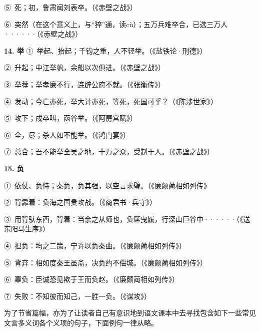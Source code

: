 ⑤\ 死；初，鲁肃闻刘表卒。（《赤壁之战》）

⑥\ 突然（在这个意义上，与“猝”通，读cù）；五万兵难卒合，已选三万人······（《赤壁之战》）

\textbf{14. 举}
①\ 举起、抬起；千钧之重，人不轻举。（《盐铁论·刑德》）

②\ 升起；中江举帆，余船以次俱进。（《赤壁之战》）

③\ 举荐；举孝廉不行，连辟公府不就。（《张衡传》）

④\ 发动；今亡亦死，举大计亦死，等死，死国可乎？（《陈涉世家》）

⑤\ 攻下；戍卒叫，函谷举。（《阿房宫赋》）

⑥\ 全，尽；杀人如不能举。（《鸿门宴》）

⑦\ 总合；吾不能举全吴之地，十万之众，受制于人。（《赤壁之战》）

\textbf{15. 负}

①\ 依仗、负恃；秦负，负其强，以空言求璧。（《廉颇蔺相如列传》

②\ 背靠着：负海之国贵攻战。（《商君书·兵守》）

③\ 用背驮东西，背着：当余之从师也，负箧曳履，行深山巨谷中······（《送东阳马生序》）

④\ 担负：均之二策，宁许以负秦曲。（《廉颇蔺相如列传》）

⑤\ 背弃：相如度秦王虽斋，决负约不偿城。（《廉颇蔺相如列传》）

⑥\ 辜负：臣诚恐见欺于王而负赵。（《廉颇蔺相如列传》）

⑦\ 失败：不知彼而知己，一胜一负。（《谋攻》）

为了节省篇幅，亦为了让读者自己有意识地到语文课本中去寻找包含如下一些常见文言多义词各个义项的句子，下面例句一律从略。

